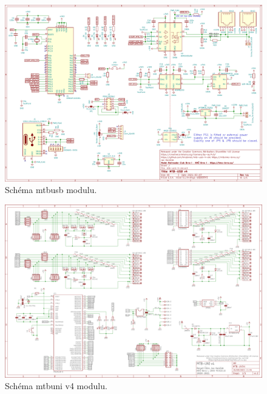 \vspace{-2em}

\begin{figure}[H]
\includegraphics[angle=90,width=\textwidth]{data/mtb-usb-4-ele.pdf}
\caption{Schéma \gls{mtbusb} modulu.}
\label{fig:mtb-usb-sch}
\end{figure}

\begin{figure}[ht]
\includegraphics[angle=90,width=\textwidth]{data/mtb-uni-4-ele.pdf}
\caption{Schéma \gls{mtbuni} v4 modulu.}
\label{fig:mtb-uni-4-sch}
\end{figure}
